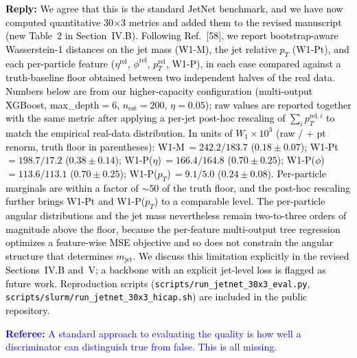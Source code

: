 \documentclass[11pt]{article}
\newcommand{\refcomment}[1]{\textcolor{blue}{\textbf{Referee:} #1}}
\newcommand{\reply}[1]{\textcolor{black}{\textbf{Reply:} #1}}
\begin{document}
\reply{We agree that this is the standard JetNet benchmark, and we have now computed quantitative 30$\times$3 metrics and added them to the revised manuscript (new Table~2 in Section~IV.B). Following Ref.~[58], we report bootstrap-aware Wasserstein-1 distances on the jet mass (W1-M), the jet relative $p_T$ (W1-Pt), and each per-particle feature ($\eta^\mathrm{rel}$, $\phi^\mathrm{rel}$, $p_T^\mathrm{rel}$, W1-P), in each case compared against a truth-baseline floor obtained between two independent halves of the real data. Numbers below are from our higher-capacity configuration (multi-output XGBoost, max\_depth$=6$, $n_\mathrm{est}=200$, $\eta=0.05$); raw values are reported together with the same metric after applying a per-jet post-hoc rescaling of $\sum_i p_T^{\mathrm{rel},i}$ to match the empirical real-data distribution. In units of $W_1 \times 10^3$ (raw / + pt renorm, truth floor in parentheses): W1-M\,$= 242.2 / 183.7$ ($0.18 \pm 0.07$); W1-Pt\,$= 198.7 / 17.2$ ($0.38 \pm 0.14$); W1-P($\eta$)\,$= 166.4 / 164.8$ ($0.70 \pm 0.25$); W1-P($\phi$)\,$= 113.6 / 113.1$ ($0.70 \pm 0.25$); W1-P($p_T$)\,$= 9.1 / 5.0$ ($0.24 \pm 0.08$). Per-particle marginals are within a factor of $\sim\!50$ of the truth floor, and the post-hoc rescaling further brings W1-Pt and W1-P($p_T$) to a comparable level. The per-particle angular distributions and the jet mass nevertheless remain two-to-three orders of magnitude above the floor, because the per-feature multi-output tree regression optimizes a feature-wise MSE objective and so does not constrain the angular structure that determines $m_\mathrm{jet}$. We discuss this limitation explicitly in the revised Sections~IV.B and~V; a backbone with an explicit jet-level loss is flagged as future work. Reproduction scripts (\texttt{scripts/run\_jetnet\_30x3\_eval.py}, \texttt{scripts/slurm/run\_jetnet\_30x3\_hicap.sh}) are included in the public repository.}

\bigskip

\refcomment{A standard approach to evaluating the quality is how well a discriminator can distinguish true from false. This is all missing.}
\end{document}
